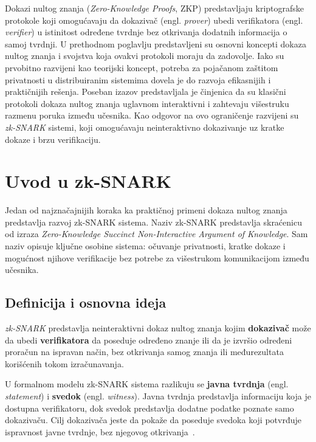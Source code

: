 
Dokazi nultog znanja (\textit{Zero-Knowledge Proofs}, ZKP) predstavljaju kriptografske protokole koji omogućavaju da dokazivač (engl. \textit{prover}) ubedi verifikatora (engl. \textit{verifier}) u istinitost određene tvrdnje bez otkrivanja dodatnih informacija o samoj tvrdnji. U prethodnom poglavlju predstavljeni su osnovni koncepti dokaza nultog znanja i svojstva koja ovakvi protokoli moraju da zadovolje. Iako su prvobitno razvijeni kao teorijski koncept, potreba za pojačanom zaštitom privatnosti u distribuiranim sistemima dovela je do razvoja efikasnijih i praktičnijih rešenja. Poseban izazov predstavljala je činjenica da su klasični protokoli dokaza nultog znanja uglavnom interaktivni i zahtevaju višestruku razmenu poruka između učesnika. Kao odgovor na ovo ograničenje razvijeni su \textit{zk-SNARK} sistemi, koji omogućavaju neinteraktivno dokazivanje uz kratke dokaze i brzu verifikaciju.

\section{Uvod u zk-SNARK}

Jedan od najznačajnijih koraka ka praktičnoj primeni dokaza nultog znanja predstavlja razvoj zk-SNARK sistema. Naziv zk-SNARK predstavlja skraćenicu od izraza \textit{Zero-Knowledge Succinct Non-Interactive Argument of Knowledge}. Sam naziv opisuje ključne osobine sistema: očuvanje privatnosti, kratke dokaze i mogućnost njihove verifikacije bez potrebe za višestrukom komunikacijom između učesnika.

\subsection{Definicija i osnovna ideja}

\begin{definition}

\textit{zk-SNARK} predstavlja neinteraktivni dokaz nultog znanja kojim \textbf{dokazivač} može da ubedi \textbf{verifikatora} da poseduje određeno znanje ili da je izvršio određeni proračun na ispravan način, bez otkrivanja samog znanja ili međurezultata korišćenih tokom izračunavanja.

\end{definition}

U formalnom modelu zk-SNARK sistema razlikuju se \textbf{javna tvrdnja} (engl. \textit{statement}) i \textbf{svedok} (engl. \textit{witness}). Javna tvrdnja predstavlja informaciju koja je dostupna verifikatoru, dok svedok predstavlja dodatne podatke poznate samo dokazivaču. Cilj dokazivača jeste da pokaže da poseduje svedoka koji potvrđuje ispravnost javne tvrdnje, bez njegovog otkrivanja~\cite{nitulescu2023snarks}.


